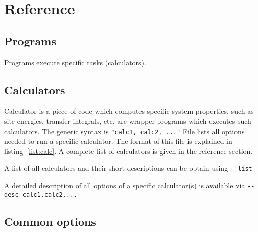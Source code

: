 \chapter{Reference}
\label{sec:reference}
\section{Programs}
\label{ref:programs}
\label{sec:programs}
Programs execute specific tasks (calculators). 



\section{Calculators}
\label{ref:calculators}
\label{sec:calculators}

Calculator is a piece of code which computes specific system properties, such as site energies, transfer integrals, etc. \xtprun  are wrapper programs which executes such calculators. The generic syntax is 
\vskip 0.2cm
{\noindent \small \xtprun \exe \texttt{"calc1, calc2, ..."} \opt \xmloptions }
\vskip 0.2cm
%
File \xmloptions lists all options needed to run a specific calculator. The format of this file is explained in listing~\ref{list:calc}. A complete list of calculators is given in the  reference section.
%


A list of all calculators and their short descriptions can be obtain using 
\vskip 0.1cm
{\noindent \small \xtprun \texttt{-{}-list} }
\vskip 0.1cm

A detailed description of all options of a specific calculator(s) is available via
\vskip 0.1cm
{\noindent \small \xtprun \texttt{-{}-desc calc1,calc2,...} }


\vfill

\section{Common options}
\label{ref:options}
{\small 

}
\vfill
